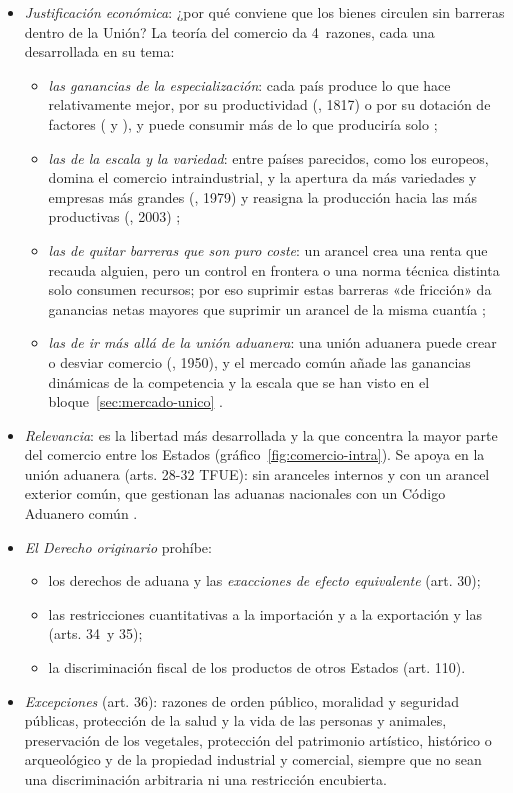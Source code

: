 \documentclass[11pt]{article}
\begin{document}
\begin{itemize}
\item \emph{Justificación económica}: ¿por qué conviene que los bienes circulen sin barreras dentro de la Unión? La teoría del comercio da 4~razones, cada una desarrollada en su tema:
  \begin{itemize}
  \item \emph{las ganancias de la especialización}: cada país produce lo que hace relativamente mejor, por su productividad (, 1817) o por su dotación de factores ( y ), y puede consumir más de lo que produciría solo ;
  \item \emph{las de la escala y la variedad}: entre países parecidos, como los europeos, domina el comercio intraindustrial, y la apertura da más variedades y empresas más grandes (, 1979) y reasigna la producción hacia las más productivas (, 2003) ;
  \item \emph{las de quitar barreras que son puro coste}: un arancel crea una renta que recauda alguien, pero un control en frontera o una norma técnica distinta solo consumen recursos; por eso suprimir estas barreras «de fricción» da ganancias netas mayores que suprimir un arancel de la misma cuantía\nocite{BaldwinWyplosz2020Economics} ;
  \item \emph{las de ir más allá de la unión aduanera}: una unión aduanera puede crear o desviar comercio (, 1950), y el mercado común añade las ganancias dinámicas de la competencia y la escala que se han visto en el bloque~\ref{sec:mercado-unico} .
  \end{itemize}
\item \emph{Relevancia}: es la libertad más desarrollada y la que concentra la mayor parte del comercio entre los Estados (gráfico~\ref{fig:comercio-intra}). Se apoya en la unión aduanera (arts. 28-32 TFUE): sin aranceles internos y con un arancel exterior común, que gestionan las aduanas nacionales con un Código Aduanero común .
\item \emph{El Derecho originario} prohíbe:
  \begin{itemize}
  \item los derechos de aduana y las \emph{exacciones de efecto equivalente} (art. 30);
  \item las restricciones cuantitativas a la importación y a la exportación y las  (arts. 34~y 35);
  \item la discriminación fiscal de los productos de otros Estados (art. 110).
  \end{itemize}
\item \emph{Excepciones} (art. 36): razones de orden público, moralidad y seguridad públicas, protección de la salud y la vida de las personas y animales, preservación de los vegetales, protección del patrimonio artístico, histórico o arqueológico y de la propiedad industrial y comercial, siempre que no sean una discriminación arbitraria ni una restricción encubierta.
\end{itemize}
\end{document}

